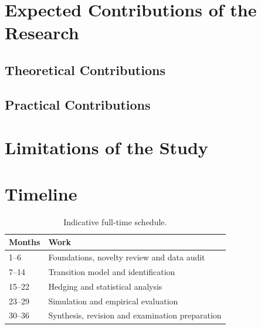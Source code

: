 \documentclass[12pt,final]{article}
\begin{document}
	\section{Expected Contributions of the Research} %

	\subsection{Theoretical Contributions}

	\subsection{Practical Contributions}

	\section{Limitations of the Study} %

	\section{Timeline} %

	\begin{table}[H]
		\centering
		\caption{Indicative full-time schedule.}
		\label{tab:timeline}
		\begin{tabular}{@{}ll@{}}
			\hline
			\textbf{Months} & \textbf{Work} \\
			\hline
			1--6   & Foundations, novelty review and data audit \\
			7--14  & Transition model and identification \\
			15--22 & Hedging and statistical analysis \\
			23--29 & Simulation and empirical evaluation \\
			30--36 & Synthesis, revision and examination preparation \\
			\hline
		\end{tabular}
	\end{table}
\end{document}
